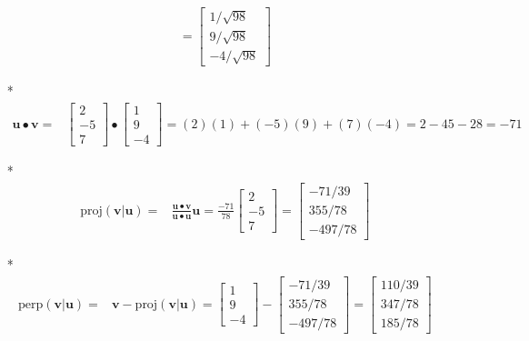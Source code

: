 \documentclass{article}
\begin{document}
\begin{itemize}
\begin{align*}
= \begin{bmatrix} 1/\sqrt{98} \\ 9/\sqrt{98} \\ -4/\sqrt{98} \end{bmatrix}
\end{align*}
\item[*] \begin{align*}
\mathbf{u} \bullet \mathbf{v} = & \begin{bmatrix} 2 \\ -5 \\ 7 \end{bmatrix} \bullet \begin{bmatrix} 1 \\ 9 \\ -4 \end{bmatrix} 
= (2)(1) + (-5)(9) + (7)(-4) 
= 2 - 45 - 28 
= -71
\end{align*}
\item[*] \begin{align*}
\text{proj}(\mathbf{v} | \mathbf{u}) = & \frac{\mathbf{u} \bullet \mathbf{v}}{\mathbf{u} \bullet \mathbf{u}}\mathbf{u}
= \frac{-71}{78}\begin{bmatrix} 2 \\ -5 \\ 7 \end{bmatrix} 
= \begin{bmatrix} -71/39 \\ 355/78 \\ -497/78 \end{bmatrix}
\end{align*}
\item[*] \begin{align*}
\text{perp}(\mathbf{v} | \mathbf{u}) = & \mathbf{v} - \text{proj}(\mathbf{v} | \mathbf{u})
= \begin{bmatrix} 1 \\ 9 \\ -4 \end{bmatrix} - \begin{bmatrix} -71/39 \\ 355/78 \\ -497/78 \end{bmatrix} 
= \begin{bmatrix} 110/39 \\ 347/78 \\ 185/78 \end{bmatrix}
\end{align*}

\end{itemize}
\end{document}
